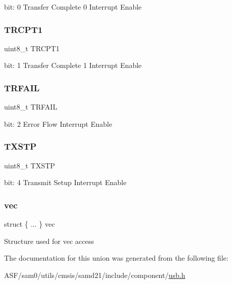 bit\+: 0 Transfer Complete 0 Interrupt Enable \mbox{\label{union_u_s_b___h_o_s_t___p_i_n_t_e_n_s_e_t___type_abfd778fdb9c052b995d0dabc9e75081b}} 
\subsubsection{\texorpdfstring{TRCPT1}{TRCPT1}}
{\footnotesize\ttfamily uint8\+\_\+t T\+R\+C\+P\+T1}

bit\+: 1 Transfer Complete 1 Interrupt Enable \mbox{\label{union_u_s_b___h_o_s_t___p_i_n_t_e_n_s_e_t___type_a07aec3336bfd9ba5afd1e3ee3272fc96}} 
\subsubsection{\texorpdfstring{TRFAIL}{TRFAIL}}
{\footnotesize\ttfamily uint8\+\_\+t T\+R\+F\+A\+IL}

bit\+: 2 Error Flow Interrupt Enable \mbox{\label{union_u_s_b___h_o_s_t___p_i_n_t_e_n_s_e_t___type_a12a45aab272091d34c3e30cf8aa046fe}} 
\subsubsection{\texorpdfstring{TXSTP}{TXSTP}}
{\footnotesize\ttfamily uint8\+\_\+t T\+X\+S\+TP}

bit\+: 4 Transmit Setup Interrupt Enable \mbox{\label{union_u_s_b___h_o_s_t___p_i_n_t_e_n_s_e_t___type_a9e946bf6470d5048eb9c09f8d30a2892}} 
\subsubsection{\texorpdfstring{vec}{vec}}
{\footnotesize\ttfamily struct \{ ... \}   vec}

Structure used for vec access 

The documentation for this union was generated from the following file\+:\begin{DoxyCompactItemize}
\item 
A\+S\+F/sam0/utils/cmsis/samd21/include/component/\mbox{\hyperlink{component_2usb_8h}{usb.\+h}}\end{DoxyCompactItemize}
